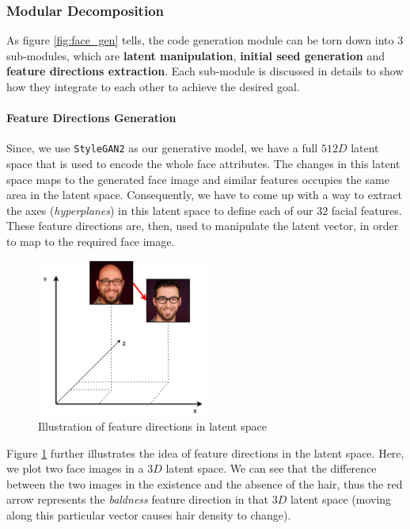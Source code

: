 \subsubsection{Modular Decomposition}

As figure \ref{fig:face_gen} tells, the code generation module can be torn down into $3$ sub-modules, which are \textbf{latent manipulation}, \textbf{initial seed generation} and \textbf{feature directions extraction}. Each sub-module is discussed in details to show how they integrate to each other to achieve the desired goal.

\paragraph{Feature Directions Generation}
Since, we use \texttt{StyleGAN2} \cite{karras2020analyzing} as our generative model, we have a full $512D$ latent space that is used to encode the whole face attributes. The changes in this latent space maps to the generated face image and similar features occupies the same area in the latent space. Consequently, we have to come up with a way to extract the axes (\emph{hyperplanes}) in this latent space to define each of our $32$ facial features. These feature directions are, then, used to manipulate the latent vector, in order to map to the required face image. 

\begin{figure}[H]
    \centering
    \includegraphics[width=0.5\textwidth]{images/feature-dir.png}
    \caption{Illustration of feature directions in latent space}
    \label{fig:feature_dir}
\end{figure}

Figure \ref{fig:feature_dir} further illustrates the idea of feature directions in the latent space. Here, we plot two face images in a $3D$ latent space. We can see that the difference between the two images in the existence and the absence of the hair, thus the red arrow represents the \emph{baldness} feature direction in that $3D$ latent space (moving along this particular vector causes hair density to change).


